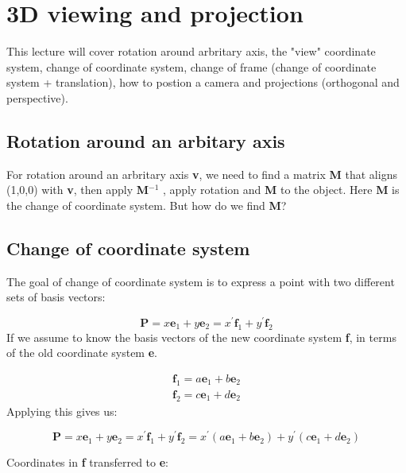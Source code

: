 \section{3D viewing and projection}
This lecture will cover rotation around arbritary axis, the "view" coordinate system, change of coordinate system, change of frame (change of coordinate system + translation), how to postion a camera and projections (orthogonal and perspective).

	\subsection*{Rotation around an arbitary axis}
	For rotation around an arbritary axis \textbf{v}, we need to find a matrix \textbf{M} that aligns (1,0,0) with \textbf{v}, then apply \textbf{M$^{-1}$} , apply rotation and \textbf{M} to the object. Here \textbf{M} is the change of coordinate system. But how do we find \textbf{M}?

	\subsection*{Change of coordinate system}
	The goal of change of coordinate system is to express a point with two different sets of basis vectors:
	
		\begin{equation}
			\textbf{P} = x \textbf{e}_1 + y\textbf{e}_2 = 
			x^{\prime} \textbf{f}_1 + y^{\prime}\textbf{f}_2
		\end{equation}
	If we assume to know the basis vectors of the new coordinate system \textbf{f}, in terms of the old coordinate system \textbf{e}.

		\begin{equation}
		\begin{aligned}
				\textbf{f}_1 = a \textbf{e}_1 + b \textbf{e}_2 \\ \textbf{f}_2 = c \textbf{e}_1 + d \textbf{e}_2 
		\end{aligned}
		\end{equation}
	Applying this gives us:

	\begin{equation}
	\textbf{P} = x \textbf{e}_1 + y\textbf{e}_2 = 
	x^{\prime} \textbf{f}_1 + y^{\prime}\textbf{f}_2 =
	x^{\prime}(a \textbf{e}_1 + b \textbf{e}_2) + y^{\prime}(c \textbf{e}_1 + d \textbf{e}_2)
	\end{equation}

	Coordinates in \textbf{f} transferred to \textbf{e}:

